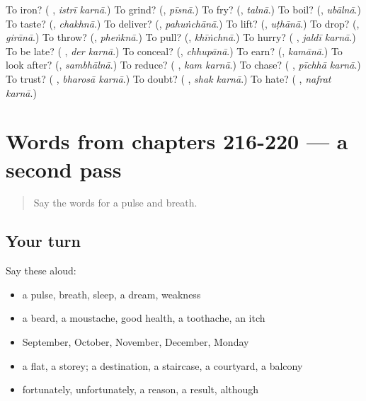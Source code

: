 \begin{tcolorbox}[breakable,colback=teal!4,colframe=teal!35!black,title={Before you move on}]
To iron? (\textbf{ }, \emph{istrī karnā}.) To grind? (\textbf{}, \emph{pīsnā}.) To fry? (\textbf{}, \emph{talnā}.) To boil? (\textbf{}, \emph{ubālnā}.) To taste? (\textbf{}, \emph{chakhnā}.) To deliver? (\textbf{}, \emph{pahuṅchānā}.) To lift? (\textbf{}, \emph{uṭhānā}.) To drop? (\textbf{}, \emph{girānā}.) To throw? (\textbf{}, \emph{pheṅknā}.) To pull? (\textbf{}, \emph{khīṅchnā}.) To hurry? (\textbf{ }, \emph{jaldī karnā}.) To be late? (\textbf{ }, \emph{der karnā}.) To conceal? (\textbf{}, \emph{chhupānā}.) To earn? (\textbf{}, \emph{kamānā}.) To look after? (\textbf{}, \emph{sambhālnā}.) To reduce? (\textbf{ }, \emph{kam karnā}.) To chase? (\textbf{ }, \emph{pīchhā karnā}.) To trust? (\textbf{ }, \emph{bharosā karnā}.) To doubt? (\textbf{ }, \emph{shak karnā}.) To hate? (\textbf{ }, \emph{nafrat karnā}.)
\end{tcolorbox}
\section[(dialogue)]{Words from chapters 216-220 — a second pass}

\label{lesson:UR-R220-second-pass-words-from-chapters-216-220}



\begin{quote}
Say the words for a pulse and breath.
\end{quote}

\subsection*{Your turn}
Say these aloud:

\begin{itemize}
\raggedright
  \item a pulse, breath, sleep, a dream, weakness
  \item a beard, a moustache, good health, a toothache, an itch
  \item September, October, November, December, Monday
  \item a flat, a storey; a destination, a staircase, a courtyard, a balcony
  \item fortunately, unfortunately, a reason, a result, although
\end{itemize}

